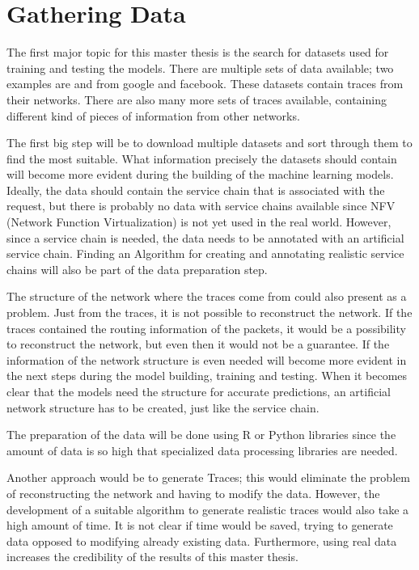 \documentclass[12pt,a4paper]{scrartcl}
\begin{document}
	\section{Gathering Data}
	The first major topic for this master thesis is the search for datasets used for training and testing the models.
	There are multiple sets of data available; two examples are \cite{GoogleData} and \cite{FacebookData} from google and facebook.
	These datasets contain traces from their networks.
	There are also many more sets of traces available, containing different kind of pieces of information from other networks.
	
	The first big step will be to download multiple datasets and sort through them to find the most suitable.
	What information precisely the datasets should contain will become more evident during the building of the machine learning models.
	Ideally, the data should contain the service chain that is associated with the request, but there is probably no data with service chains available since NFV (Network Function Virtualization) is not yet used in the real world.
	However, since a service chain is needed, the data needs to be annotated with an artificial service chain.
	Finding an Algorithm for creating and annotating realistic service chains will also be part of the data preparation step.
	
	The structure of the network where the traces come from could also present as a problem.
	Just from the traces, it is not possible to reconstruct the network.
	If the traces contained the routing information of the packets, it would be a possibility to reconstruct the network, but even then it would not be a guarantee.
	If the information of the network structure is even needed will become more evident in the next steps during the model building, training and testing.
	When it becomes clear that the models need the structure for accurate predictions, an artificial network structure has to be created, just like the service chain.
	
	The preparation of the data will be done using R or Python libraries since the amount of data is so high that specialized data processing libraries are needed.
	
	Another approach would be to generate Traces; this would eliminate the problem of reconstructing the network and having to modify the data.
	However, the development of a suitable algorithm to generate realistic traces would also take a high amount of time.
	It is not clear if time would be saved, trying to generate data opposed to modifying already existing data.
	Furthermore, using real data increases the credibility of the results of this master thesis.
	
\end{document}
